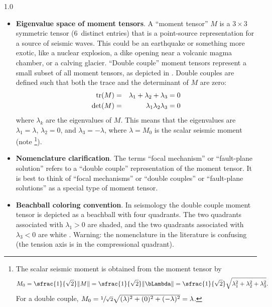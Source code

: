 \documentclass[11pt,titlepage,fleqn]{article}
\newcommand{\Mmat}{M}
\begin{document}
\begin{spacing}{1.0}
\begin{itemize}
\item {\bf Eigenvalue space of moment tensors}. A ``moment tensor'' $\Mmat$ is a $3 \times 3$ symmetric tensor (6~distinct entries) that is a point-source representation for a source of seismic waves. This could be an earthquake or something more exotic, like a nuclear explosion, a dike opening near a volcanic magma chamber, or a calving glacier. ``Double couple'' moment tensors represent a small subset of all moment tensors, as depicted in . Double couples are defined such that both the trace and the determinant of $\Mmat$ are zero:
%
\begin{eqnarray*}
{\rm tr}(\Mmat) &=& \lambda_1 + \lambda_2 + \lambda_3 = 0
\\
\det(\Mmat) &=& \lambda_1 \lambda_2 \lambda_3 = 0
\end{eqnarray*}
%
where $\lambda_k$ are the eigenvalues of $\Mmat$. This means that the eigenvalues are $\lambda_1 = \lambda$, $\lambda_2 = 0$, and $\lambda_3 = -\lambda$, where $\lambda = M_0$ is the scalar seismic moment (note \footnote{The scalar seismic moment is obtained from the moment tensor by
%
\begin{equation}
M_0 = \sfrac{1}{\sqrt{2}} \| \Mmat \|
= \sfrac{1}{\sqrt{2}} \| \bLambda \|
= \sfrac{1}{\sqrt{2}} \sqrt{\lambda_1^2 + \lambda_2^2 + \lambda_3^2}.
\end{equation}
%
For a double couple, $M_0 = \sfrac{1}{\sqrt{2}}\sqrt{(\lambda)^2 + (0)^2 + (-\lambda)^2} = \lambda$.
}).

\item {\bf Nomenclature clarification}. 
The terms ``focal mechanism'' or ``fault-plane solution'' refers to a ``double couple'' representation of the moment tensor. It is best to think of ``focal mechanisms'' or ``double couples'' or ``fault-plane solutions'' as a special type of moment tensor.

\item {\bf Beachball coloring convention}. 
In seismology the double couple moment tensor is depicted as a beachball with four quadrants. The two quadrants associated with \mbox{$\lambda_1 > 0$} are shaded, and the two quadrants associated with \mbox{$\lambda_3 < 0$} are white \citep[][p.~257]{ShearerE2} \citep[][p.~224]{SteinWysession}. Warning: the nomenclature in the literature is confusing (\eg the tension axis is in the compressional quadrant).

\end{itemize}

\end{spacing}
\end{document}
